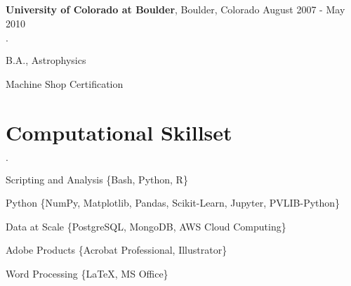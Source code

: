\documentclass[margin,line]{res}
\newenvironment{list2}{
  \begin{list}{$\cdot$}{%
      \setlength{\itemsep}{0in}
      \setlength{\parsep}{0in} \setlength{\parskip}{0in}
      \setlength{\topsep}{0in} \setlength{\partopsep}{0in} 
      \setlength{\leftmargin}{0.2in}}}{\end{list}}
\newenvironment{list3}{
  \begin{list}{$\cdot$}{%
      \setlength{\itemsep}{0in}
      \setlength{\parsep}{0in} \setlength{\parskip}{0in}
      \setlength{\topsep}{0in} \setlength{\partopsep}{0in} 
      \setlength{\leftmargin}{0.1in}}}{\end{list}}
\begin{document}
\begin{resume}
{\bf University of Colorado at Boulder}, Boulder, Colorado \hfill {August 2007 - May 2010}\\
\vspace*{-.15in}
\begin{list2}
\item B.A., Astrophysics
\item Machine Shop Certification
\end{list2}




\section{\sc Computational Skillset}

\begin{list3}
\item Scripting and Analysis \{Bash, Python, R\}
\item Python \{NumPy, Matplotlib, Pandas, Scikit-Learn, Jupyter, PVLIB-Python\}
\item Data at Scale \{PostgreSQL, MongoDB, AWS Cloud Computing\}
\item Adobe Products \{Acrobat Professional, Illustrator\}
\item Word Processing \{\LaTeX, MS Office\}
\end{list3}



\end{resume}
\end{document}
